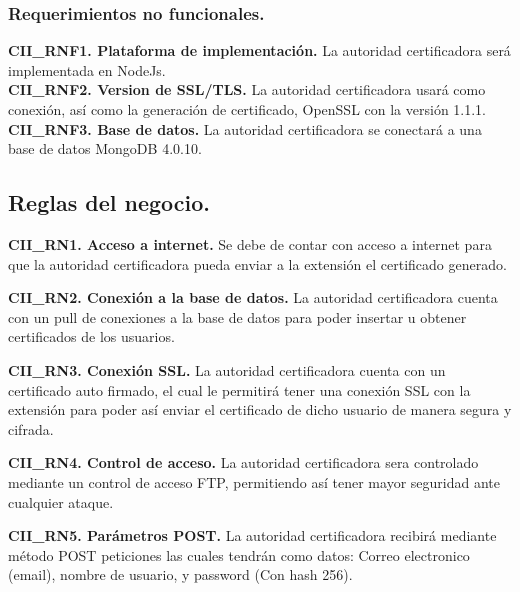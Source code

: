 \documentclass[12pt, a4paper, titlepage]{report}
\begin{document}
	            \subsubsection{Requerimientos no funcionales.}
	            {\setlength{\parindent}{12pt}
				
				\textbf{CII\_RNF1. Plataforma de implementación.} La autoridad certificadora será implementada en NodeJs.\\
				
				\textbf{CII\_RNF2. Version de SSL/TLS.} La autoridad certificadora usará como conexión, así como la generación de certificado, OpenSSL con la versión 1.1.1.\\
				
				\textbf{CII\_RNF3. Base de datos.} La autoridad certificadora se conectará a una base de datos MongoDB 4.0.10.\\
				
				}
	            
	            
	        \subsection{Reglas del negocio.}
	        
	        \textbf{CII\_RN1. Acceso a internet.} Se debe de contar con acceso a internet para que la autoridad certificadora pueda enviar a la extensión el certificado generado.\\
            \label{CII_RN1}
            
            \textbf{CII\_RN2. Conexión a la base de datos.} La autoridad certificadora cuenta con un pull de conexiones a la base de datos para poder insertar u obtener certificados de los usuarios.\\
            \label{CII_RN2}
            
            \textbf{CII\_RN3. Conexión SSL.} La autoridad certificadora cuenta con un certificado auto firmado, el cual le permitirá tener una conexión SSL con la extensión para poder así enviar el certificado de dicho usuario de manera segura y cifrada.\\
            \label{CII_RN3}
            
            \textbf{CII\_RN4. Control de acceso.} La autoridad certificadora sera controlado mediante un control de acceso FTP, permitiendo así tener mayor seguridad ante cualquier ataque.\\
            \label{CII_RN4}
            
            \textbf{CII\_RN5. Parámetros POST.} La autoridad certificadora recibirá mediante método POST peticiones las cuales tendrán como datos: Correo electronico (email), nombre de usuario, y password (Con hash 256).\\
            \label{CII_RN5}
            
\end{document}
